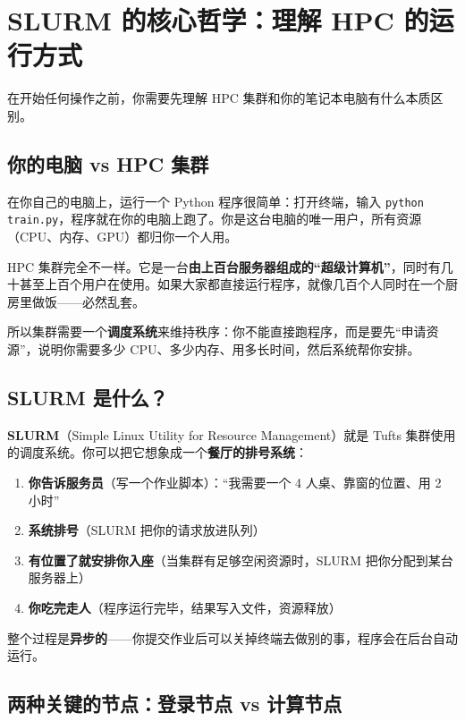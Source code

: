 \section{SLURM 的核心哲学：理解 HPC 的运行方式}

在开始任何操作之前，你需要先理解 HPC 集群和你的笔记本电脑有什么本质区别。

\subsection{你的电脑 vs HPC 集群}

在你自己的电脑上，运行一个 Python 程序很简单：打开终端，输入 \texttt{python train.py}，程序就在你的电脑上跑了。你是这台电脑的唯一用户，所有资源（CPU、内存、GPU）都归你一个人用。

HPC 集群完全不一样。它是一台\textbf{由上百台服务器组成的``超级计算机''}，同时有几十甚至上百个用户在使用。如果大家都直接运行程序，就像几百个人同时在一个厨房里做饭——必然乱套。

所以集群需要一个\textbf{调度系统}来维持秩序：你不能直接跑程序，而是要先``申请资源''，说明你需要多少 CPU、多少内存、用多长时间，然后系统帮你安排。

\subsection{SLURM 是什么？}

\textbf{SLURM}（Simple Linux Utility for Resource Management）就是 Tufts 集群使用的调度系统。你可以把它想象成一个\textbf{餐厅的排号系统}：

\begin{enumerate}[nosep]
  \item \textbf{你告诉服务员}（写一个作业脚本）：``我需要一个 4 人桌、靠窗的位置、用 2 小时''
  \item \textbf{系统排号}（SLURM 把你的请求放进队列）
  \item \textbf{有位置了就安排你入座}（当集群有足够空闲资源时，SLURM 把你分配到某台服务器上）
  \item \textbf{你吃完走人}（程序运行完毕，结果写入文件，资源释放）
\end{enumerate}

整个过程是\textbf{异步的}——你提交作业后可以关掉终端去做别的事，程序会在后台自动运行。

\subsection{两种关键的节点：登录节点 vs 计算节点}

